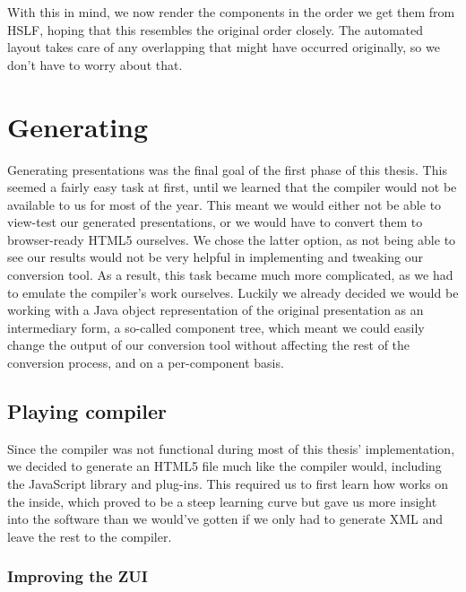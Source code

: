     With this in mind, we now render the components in the order we get them
    from HSLF, hoping that this resembles the original order closely. The
    automated layout takes care of any overlapping that might have occurred
    originally, so we don't have to worry about that.

  \section{Generating \mxp}

   Generating \mxp presentations was the final goal of the first phase of this
   thesis. This seemed a fairly easy task at first, until we learned that the
   \mxp compiler would not be available to us for most of the year. This meant
   we would either not be able to view-test our generated presentations, or we
   would have to convert them to browser-ready HTML5 ourselves. We chose the
   latter option, as not being able to see our results would not be very
   helpful in implementing and tweaking our conversion tool. As a result, this
   task became much more complicated, as we had to emulate the compiler's work
   ourselves. Luckily we already decided we would be working with a Java object
   representation of the original presentation as an intermediary form, a
   so-called component tree, which meant we could easily change the output of
   our conversion tool without affecting the rest of the conversion process,
   and on a per-component basis.


   \subsection{Playing \mxp compiler}

    Since the \mxp compiler was not functional during most of this thesis'
    implementation, we decided to generate an HTML5 file much like the \mxp
    compiler would, including the \mxp JavaScript library and plug-ins. This
    required us to first learn how \mxp works on the inside, which proved to be
    a steep learning curve but gave us more insight into the software than we
    would've gotten if we only had to generate \mxp XML and leave the rest to
    the compiler.

    \subsubsection{Improving the ZUI}
   
